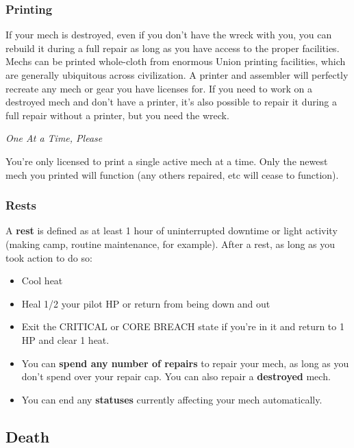 \subsubsection{Printing}

If your mech is destroyed, even if you don’t have the wreck with you, you can rebuild it during a full repair as long as you have access to the proper facilities. Mechs can be printed whole-cloth from enormous Union printing facilities, which are generally ubiquitous across civilization. A printer and assembler will perfectly recreate any mech or gear you have licenses for. If you need to work on a destroyed mech and don’t have a printer, it’s also possible to repair it during a full repair without a printer, but you need the wreck. 

\begin{center}
  \textit{One At a Time, Please}
\end{center}

You’re only licensed to print a single active mech at a time. Only the newest mech you printed will function (any others repaired, etc will cease to function).

\subsubsection{Rests}

A \textbf{rest} is defined as at least 1 hour of uninterrupted downtime or light activity (making camp, routine maintenance, for example). After a rest, as long as you took action to do so: 
\begin{itemize}
\item Cool heat
\item Heal 1/2 your pilot HP or return from being down and out 
\item Exit the CRITICAL or CORE BREACH state if you’re in it and return to 1 HP and clear 1 heat.
\item You can \textbf{spend any number of repairs} to repair your mech, as long as you don’t spend over your repair cap. You can also repair a \textbf{destroyed} mech.
\item You can end any \textbf{statuses} currently affecting your mech automatically.
\end{itemize}

\subsection{Death}


